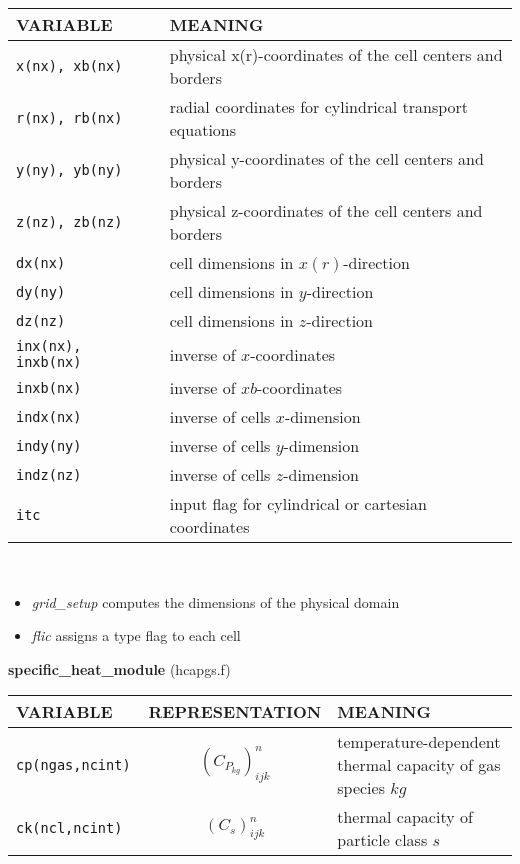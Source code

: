 \begin{tabular}{|p{6cm}|p{6cm}|}\hline
VARIABLE & MEANING\\\hline
\tt x(nx), xb(nx) & physical x(r)-coordinates of the cell centers and borders \\ \hline
\tt r(nx), rb(nx) & radial coordinates for cylindrical transport equations \\ \hline
\tt y(ny), yb(ny) & physical y-coordinates of the cell centers and borders \\ \hline
\tt z(nz), zb(nz) & physical z-coordinates of the cell centers and borders \\ \hline
\tt dx(nx) & cell dimensions in $x(r)$-direction\\ \hline
\tt dy(ny) & cell dimensions in $y$-direction\\ \hline
\tt dz(nz) & cell dimensions in $z$-direction\\ \hline
\tt inx(nx), inxb(nx) & inverse of $x$-coordinates \\ \hline
\tt inxb(nx) & inverse of $xb$-coordinates \\ \hline
\tt indx(nx) & inverse of cells $x$-dimension\\ \hline
\tt indy(ny) & inverse of cells $y$-dimension\\ \hline
\tt indz(nz) & inverse of cells $z$-dimension\\ \hline
\tt itc       & input flag for cylindrical or cartesian coordinates\\ \hline
\end{tabular}\\[5mm]
\begin{itemize}
\item{\em grid\_setup} computes the dimensions of the physical domain\\
\item{\em flic} assigns a type flag to each cell\\
\end{itemize}
%
%
{\large{\bf specific\_heat\_module}} (hcapgs.f)\\[5mm]
\begin{tabular}{|p{6cm}|c|p{6cm}|}\hline
VARIABLE & REPRESENTATION & MEANING\\\hline
\tt cp(ngas,ncint) & $(C_{P_{kg}})^n_{ijk}$ & temperature-dependent thermal capacity of gas species $kg$\\\hline
\tt ck(ncl,ncint) & $(C_s)^n_{ijk}$ & thermal capacity of particle class $s$\\\hline
\end{tabular}\\
